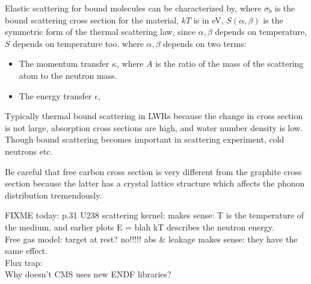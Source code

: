 \documentclass{school-22.211-notes}
\begin{document}
  Elastic scattering for bound molecules can be characterized by,
  where $\sigma_b$ is the bound scattering cross section for the material, $kT$ is in eV, $S(\alpha, \beta)$ is the symmetric form of the thermal scattering law, since $\alpha, \beta$ depends on temperature, $S$ depends on temperature too. 
  where $\alpha, \beta$ depends on two terms:
  \begin{itemize}
  \item The momentum transfer $\kappa$,
    where $A$ is the ratio of the mass of the scattering atom to the neutron mass.
  \item The energy transfer $\epsilon$,
  \end{itemize}
Typically thermal bound scattering in LWRs because the change in cross section is not large, absorption cross sections are high, and water number density is low. Though bound scattering becomes important in scattering experiment, cold neutrons etc. 


Be careful that free carbon cross section is very different from the graphite cross section because the latter has a crystal lattice structure which affects the phonon distribution tremendously. 



FIXME today: p.31 U238 scattering kernel: makes sense: T is the temperature of the medium, and earlier plots E = blah kT describes the neutron energy. \\
Free gas model: target at rest? no!!!!!
abs \& leakage makes sense: they have the same effect. \\
Flux trap: \\
Why doesn't CMS uses new ENDF libraries? 
\end{document}
